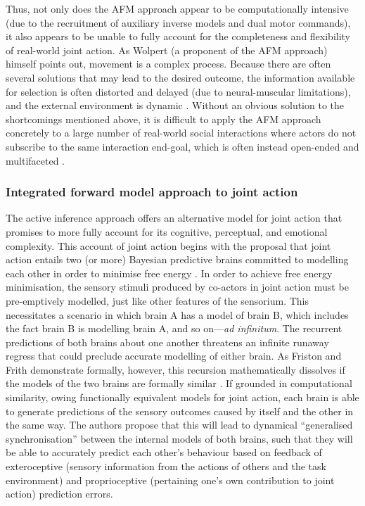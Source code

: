 \begin{CJK}{UTF8}{gbsn}
Thus, not only does the AFM approach appear to be computationally intensive (due to the recruitment of auxiliary inverse models and dual motor commands), it also appears to be unable to fully account for the completeness and flexibility of real-world joint action.  As Wolpert (a proponent of the AFM approach) himself points out, movement is a complex process. Because there are often several solutions that may lead to the desired outcome, the information available for selection is often distorted and delayed (due to neural-muscular limitations), and the external environment is dynamic \citep{Wolpert1997}.  Without an obvious solution to the shortcomings mentioned above, it is difficult to apply the AFM approach concretely to a large number of real-world social interactions where actors do not subscribe to the same interaction end-goal, which is often instead open-ended and multifaceted \citep{Pesquita2017}.



\subsubsection{Integrated forward model approach to joint action\label{sect:IFMjointAction}}
The active inference approach offers an alternative model for joint action that promises to more fully account for its cognitive, perceptual, and emotional complexity.  This account of joint action begins with the proposal that joint action entails two (or more) Bayesian predictive brains committed to modelling each other in order to minimise free energy \citep{Friston2015,Friston2015a}. In order to achieve free energy minimisation, the sensory stimuli produced by co-actors in joint action must be pre-emptively modelled, just like other features of the sensorium.  This necessitates a scenario in which brain A has a model of brain B, which includes the fact brain B is modelling brain A, and so on---\textit{ad infinitum}.  The recurrent predictions of both brains about one another threatens an infinite runaway regress that could preclude accurate modelling of either brain.  As Friston and Frith demonstrate formally, however, this recursion mathematically dissolves if the models of the two brains are formally similar \citep{Friston2015}.  If grounded in computational similarity, owing functionally equivalent models for joint action, each brain is able to generate predictions of the sensory outcomes caused by itself and the other in the same way.  The authors propose that this will lead to dynamical ``generalised synchronisation'' \citep{Barreto2003} between the internal models of both brains, such that they will be able to accurately predict each other's behaviour based on feedback of exteroceptive (sensory information from the actions of others and the task environment) and proprioceptive (pertaining one's own contribution to joint action) prediction errors.


\end{CJK}
